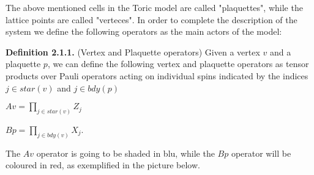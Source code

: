 \documentclass[12pt]{report}
\begin{document}
	
	\begin{minipage}{1\textwidth}
		
		The above mentioned cells in the Toric model are called "plaquettes", while the lattice points are called "verteces".
		In order to complete the description of the system we define the following operators as the main actors of the model:\newline
		
		\textbf{Definition 2.1.1.} (Vertex and Plaquette operators) Given a vertex $v$ and a plaquette $p$, we can define the following vertex and plaquette operators as tensor products over Pauli operators acting on individual spins indicated by the indices $j \in star(v)$ and $j \in bdy(p)$  \newline 
		
		\begin{center}
			$ Av = \prod_{j \in star(v)} Z_j $ \newline
			
			$ Bp = \prod_{j \in bdy(v)} X_j $.\newline
		\end{center}
		
		The $Av$ operator is going to be shaded in blu, while the $Bp$ operator will be coloured in red, as exemplified in the picture below. \newline
		
		\begin{center}
\end{center}
\end{minipage}
\end{document}
